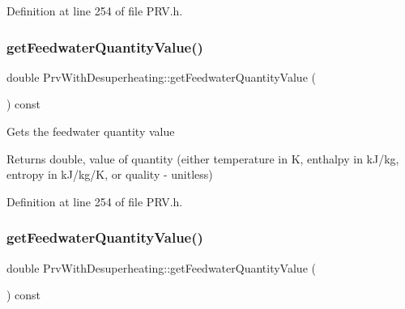 Definition at line 254 of file P\+R\+V.\+h.

\mbox{\label{class_prv_with_desuperheating_a8645a251b2e77e434a8bc51dfedcad69}} 
\subsubsection{\texorpdfstring{get\+Feedwater\+Quantity\+Value()}{getFeedwaterQuantityValue()}\hspace{0.1cm}{\footnotesize\ttfamily [2/3]}}
{\footnotesize\ttfamily double Prv\+With\+Desuperheating\+::get\+Feedwater\+Quantity\+Value (\begin{DoxyParamCaption}{ }\end{DoxyParamCaption}) const\hspace{0.3cm}{\ttfamily [inline]}}

Gets the feedwater quantity value

\begin{DoxyReturn}{Returns}
double, value of quantity (either temperature in K, enthalpy in k\+J/kg, entropy in k\+J/kg/K, or quality -\/ unitless) 
\end{DoxyReturn}


Definition at line 254 of file P\+R\+V.\+h.

\mbox{\label{class_prv_with_desuperheating_a8645a251b2e77e434a8bc51dfedcad69}} 
\subsubsection{\texorpdfstring{get\+Feedwater\+Quantity\+Value()}{getFeedwaterQuantityValue()}\hspace{0.1cm}{\footnotesize\ttfamily [3/3]}}
{\footnotesize\ttfamily double Prv\+With\+Desuperheating\+::get\+Feedwater\+Quantity\+Value (\begin{DoxyParamCaption}{ }\end{DoxyParamCaption}) const\hspace{0.3cm}{\ttfamily [inline]}}


